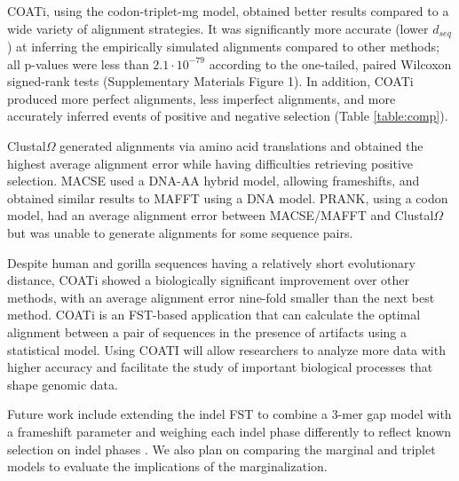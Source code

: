 COATi, using the codon-triplet-mg model, obtained better results compared to a wide variety of alignment strategies.
It was significantly more accurate (lower $d_{seq}$) at inferring the empirically simulated alignments compared to other methods; all p-values were less than $2.1 \cdot 10^{-79}$ according to the one-tailed, paired Wilcoxon signed-rank tests (Supplementary Materials Figure 1).
%
In addition, COATi produced more perfect alignments, less imperfect alignments, and more accurately inferred events of positive and negative selection (Table \ref{table:comp}).

Clustal$\Omega$ generated alignments via amino acid translations and obtained the highest average alignment error while having difficulties retrieving positive selection.
MACSE used a DNA-AA hybrid model, allowing frameshifts, and obtained similar results to MAFFT using a DNA model.
PRANK, using a codon model, had an average alignment error between MACSE/MAFFT and Clustal$\Omega$ but was unable to generate alignments for some sequence pairs.

Despite human and gorilla sequences having a relatively short evolutionary distance, COATi showed a biologically significant improvement over other methods, with an average alignment error nine-fold smaller than the next best method.
COATi is an FST-based application that can calculate the optimal alignment
between a pair of sequences in the presence of artifacts using a statistical
model.
Using COATI will allow researchers to analyze more data with higher accuracy and facilitate the study of important biological processes that shape genomic data.

Future work include extending the indel FST to combine a 3-mer gap model with a frameshift parameter and weighing each indel phase differently to reflect known selection on indel phases .
We also plan on comparing the marginal and triplet models to evaluate the implications of the marginalization.
